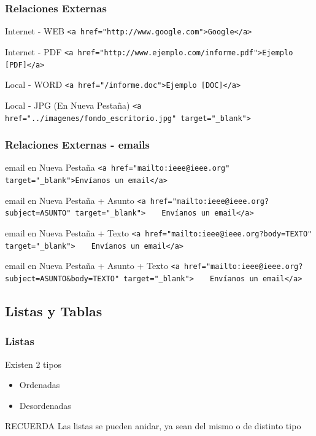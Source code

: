 \documentclass{beamer}
\begin{document}
\begin{frame}[fragile] %
\frametitle{Relaciones Externas}
	\begin{block}{Internet - WEB}
	\scriptsize{\verb|<a href="http://www.google.com">Google</a>|}
	\end{block}
	\pause
	\begin{block}{Internet - PDF}
	\scriptsize{\verb|<a href="http://www.ejemplo.com/informe.pdf">Ejemplo [PDF]</a>|}
	\end{block}
	\pause
	\begin{block}{Local - WORD}
	\scriptsize{\verb|<a href="/informe.doc">Ejemplo [DOC]</a>|}
	\end{block}
	\pause
	\begin{block}{Local - JPG (En Nueva Pestaña)}
	\scriptsize{\verb|<a href="../imagenes/fondo_escritorio.jpg" target="_blank">|}
	\end{block}
\end{frame}

\begin{frame}[fragile] %
\frametitle{Relaciones Externas - emails}
	\begin{block}{email en Nueva Pestaña}
	\scriptsize{\verb|<a href="mailto:ieee@ieee.org" target="_blank">Envíanos un email</a>|}
	\end{block}
	\pause
	\begin{block}{email en Nueva Pestaña + Asunto}
	\scriptsize{\verb|<a href="mailto:ieee@ieee.org?subject=ASUNTO" target="_blank">|
				\verb|   Envíanos un email</a>|}
	\end{block}
	\pause
	\begin{block}{email en Nueva Pestaña + Texto}
	\scriptsize{\verb|<a href="mailto:ieee@ieee.org?body=TEXTO" target="_blank">|
				\verb|   Envíanos un email</a>|}
	\end{block}	
	\pause
	\begin{block}{email en Nueva Pestaña + Asunto + Texto}
	\scriptsize{\verb|<a href="mailto:ieee@ieee.org?subject=ASUNTO&body=TEXTO" target="_blank">|
				\verb|   Envíanos un email</a>|}
	\end{block}
\end{frame}

	\subsection{Listas y Tablas}
\begin{frame}
\frametitle{Listas}
	Existen 2 tipos
	\begin{itemize}
	\item Ordenadas
	\item Desordenadas
	\end{itemize}
	\pause
	\begin{exampleblock}{RECUERDA}
	Las listas se pueden anidar, ya sean del mismo o de distinto tipo
	\end{exampleblock}
\end{frame}
\end{document}
